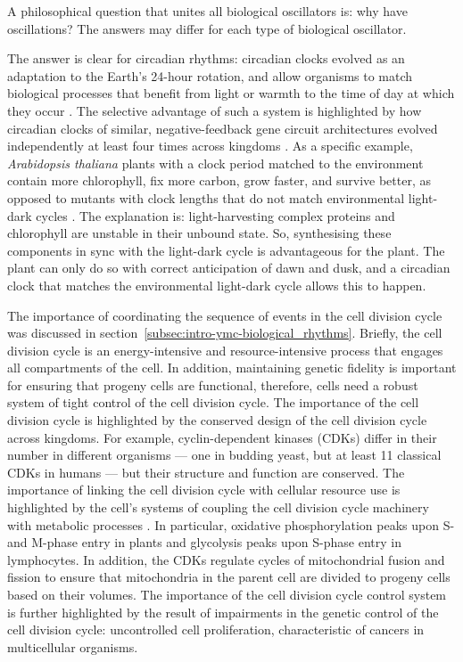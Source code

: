 A philosophical question that unites all biological oscillators is: why have oscillations?
The answers may differ for each type of biological oscillator.

The answer is clear for circadian rhythms: circadian clocks evolved as an adaptation to the Earth's 24-hour rotation, and allow organisms to match biological processes that benefit from light or warmth to the time of day at which they occur \parencite{millarInputSignalsPlant2004}.
The selective advantage of such a system is highlighted by how circadian clocks of similar, negative-feedback gene circuit architectures evolved independently at least four times across kingdoms \parencite{doddPlantCircadianClocks2005}.
As a specific example, \textit{Arabidopsis thaliana} plants with a clock period matched to the environment contain more chlorophyll, fix more carbon, grow faster, and survive better, as opposed to mutants with clock lengths that do not match environmental light-dark cycles \parencite{doddPlantCircadianClocks2005}.
The explanation is: light-harvesting complex proteins and chlorophyll are unstable in their unbound state.
So, synthesising these components in sync with the light-dark cycle is advantageous for the plant.
The plant can only do so with correct anticipation of dawn and dusk, and a circadian clock that matches the environmental light-dark cycle allows this to happen.

The importance of coordinating the sequence of events in the cell division cycle was discussed in section~\ref{subsec:intro-ymc-biological_rhythms}.
Briefly, the cell division cycle is an energy-intensive and resource-intensive process that engages all compartments of the cell.
In addition, maintaining genetic fidelity is important for ensuring that progeny cells are functional, therefore, cells need a robust system of tight control of the cell division cycle.
The importance of the cell division cycle is highlighted by the conserved design of the cell division cycle across kingdoms.
For example, cyclin-dependent kinases (CDKs) differ in their number in different organisms --- one in budding yeast, but at least 11 classical CDKs in humans \parencite{malumbresCyclindependentKinasesFamily2009} --- but their structure and function are conserved.
The importance of linking the cell division cycle with cellular resource use is highlighted by the cell's systems of coupling the cell division cycle machinery with metabolic processes \parencite{salazar-roaFuelingCellDivision2017}.
In particular, oxidative phosphorylation peaks upon S- and M-phase entry in plants and glycolysis peaks upon S-phase entry in lymphocytes.
In addition, the CDKs regulate cycles of mitochondrial fusion and fission to ensure that mitochondria in the parent cell are divided to progeny cells based on their volumes.
The importance of the cell division cycle control system is further highlighted by the result of impairments in the genetic control of the cell division cycle: uncontrolled cell proliferation, characteristic of cancers in multicellular organisms.

